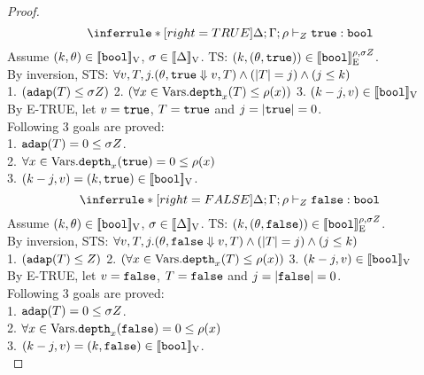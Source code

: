 \documentclass[a4paper,11pt]{article}
\theoremstyle{definition}
\begin{document}
\begin{proof}
\[
    \inferrule*[right = TRUE]{
    }{
      \Delta; \Gamma; \dmap \tvdash{\nnatA} \etrue: \tbool
    }
\]
Assume $ (k, \theta) \in [\![ \mathtt{bool} ]\!]_{\text{V}} $, $ \sigma \in [\![ \Delta ]\!]_{\text{V}}$. TS: $(k, (\theta, \mathtt{true})) \in [\![ \mathtt{bool} ]\!]_{\text{E}}^{\rho, \sigma Z}$.\\
%
By inversion, STS: $\forall v, T, j. (\theta, \mathtt{true} \mathrel{\Downarrow} v, T) \land (|T| = j) \land (j \leq k) $\\
%
1. $ (\mathtt{adap}(T) \leq \sigma Z)$
%
2. $ (\forall x \in \mbox{Vars}. \mathtt{depth}_{x}(T) \leq \rho(x))$
%
3. $ (k - j, v) \in [\![ \mathtt{bool} ]\!]_{\text{V}}$\\
%
By E-TRUE, let $v = \mathtt{true}$, $T = \mathtt{true}$ and $j = |\mathtt{true}| = 0$.\\
%
Following 3 goals are proved:\\
%
1. $\mathtt{adap}(T) = 0 \leq \sigma Z$.\\
2. $\forall x \in \mbox{Vars}. \mathtt{depth}_{x}(\mathtt{true}) = 0 \leq \rho(x)$\\
3. $(k - j, v) = (k, \mathtt{true}) \in [\![ \mathtt{bool} ]\!]_{\text{V}}$.\\



\[
    \inferrule*[right = FALSE]{
    }{
      \Delta; \Gamma; \dmap \tvdash{\nnatA} \efalse: \tbool
    }
\]
Assume $ (k, \theta) \in [\![ \mathtt{bool} ]\!]_{\text{V}} $, $ \sigma \in [\![ \Delta ]\!]_{\text{V}}$. TS: $(k, (\theta, \mathtt{false})) \in [\![ \mathtt{bool} ]\!]_{\text{E}}^{\rho, \sigma Z}$.\\
%
By inversion, STS: $\forall v, T, j. (\theta, \mathtt{false} \mathrel{\Downarrow} v, T) \land (|T| = j) \land (j \leq k) $\\
%
1. $ (\mathtt{adap}(T) \leq Z) $
%
2. $ (\forall x \in  \mbox{Vars}. \mathtt{depth}_{x}(T) \leq \rho(x))$
%
3. $(k - j, v) \in [\![ \mathtt{bool} ]\!]_{\text{V}}$\\
%
By E-TRUE, let $v = \mathtt{false}$, $T = \mathtt{false}$ and $j = |\mathtt{false}| = 0$.\\
%
Following 3 goals are proved:\\
%
1. $\mathtt{adap}(T) = 0 \leq \sigma Z$.\\
2. $\forall x \in \mbox{Vars}. \mathtt{depth}_{x}(\mathtt{false}) = 0 \leq \rho(x)$\\
3. $(k - j, v) = (k, \mathtt{false}) \in [\![ \mathtt{bool} ]\!]_{\text{V}}$.\\



\end{proof}
\end{document}
